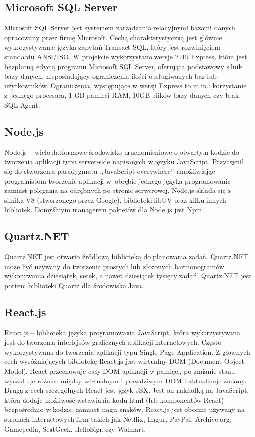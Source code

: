\documentclass[12pt,a4paper]{article}
\begin{document}
		\subsection{Microsoft SQL Server}		 
		 	\indent Microsoft SQL Server jest systemem zarządzania relacyjnymi bazami danych opracowany przez firmę Microsoft. Cechą charakterystyczną jest głównie wykorzystywanie języka
		 	zapytań	Transact-SQL, który jest rozwinięciem standardu ANSI/ISO. W projekcie wykorzystano wersje 2019 Express, która jest bezpłatną edycją programu Microsoft SQL Server, oferująca
		 	podstawowy silnik bazy danych, nieposiadający ograniczenia ilości obsługiwanych baz lub użytkowników. Ograniczenia, występujące w wersji Express to  m.in.:
		 	korzystanie z~jednego procesora, 1 GB pamięci RAM, 10GB plików bazy danych czy brak SQL Agent.
		
		\subsection{Node.js}
		\indent Node.js – wieloplatformowe środowisko uruchomieniowe o otwartym kodzie do tworzenia aplikacji typu server-side napisanych w języku JavaScript.
			Przyczynił się do stworzenia paradygmatu ,,JavaScript everywhere'' umożliwiając programistom tworzenie aplikacji w~obrębie jednego języka programowania zamiast
			polegania na odrębnych po stronie serwerowej. Node.js składa się z silnika V8 (stworzonego przez Google), biblioteki libUV oraz kilku innych bibliotek.
			Domyślnym managerem pakietów dla Node.js jest Npm. 
		
		\subsection{Quartz.NET}
			\indent Quartz.NET jest otwarto źródłową biblioteką do planowania zadań.
				Quartz.NET może być używany do tworzenia prostych lub złożonych harmonogramów wykonywania
				dziesiątek, setek, a nawet dziesiątek tysięcy zadań.
				Quartz.NET jest portem biblioteki Quartz dla środowiska Java. 	 
		
		\subsection{React.js}
			\indent React.js – biblioteka języka programowania JavaScript, która wykorzystywana jest do tworzenia interfejsów graficznych aplikacji internetowych.
				Często wykorzystywana do tworzenia aplikacji typu Single Page Application. Z głównych cech wyróżniających bibliotekę React.js jest wirtualny DOM
				(Document Object Model). React przechowuje cały DOM aplikacji w pamięci, po zmianie stanu wyszukuje różnice między wirtualnym i prawdziwym DOM
				i aktualizuje zmiany. Drugą z cech szczególnych React jest język JSX. Jest on nakładką na JavaScript, która dodaje możliwość wstawiania kodu html
				(lub komponentów React) bezpośrednio w kodzie, zamiast ciągu znaków. React.js jest obecnie używany na stronach internetowych firm takich
				jak Netflix, Imgur, PayPal, Archive.org, Gamepedia, SeatGeek, HelloSign czy Walmart.
\end{document}
